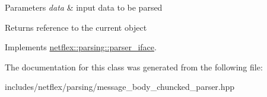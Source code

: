 \begin{DoxyParams}{Parameters}
{\em data} & input data to be parsed \\
\hline
\end{DoxyParams}
\begin{DoxyReturn}{Returns}
reference to the current object 
\end{DoxyReturn}


Implements \hyperlink{classnetflex_1_1parsing_1_1parser__iface_a6b092567e70a5c0bf7568e94d06f7154}{netflex\+::parsing\+::parser\+\_\+iface}.



The documentation for this class was generated from the following file\+:\begin{DoxyCompactItemize}
\item 
includes/netflex/parsing/message\+\_\+body\+\_\+chuncked\+\_\+parser.\+hpp\end{DoxyCompactItemize}
